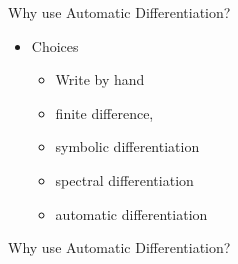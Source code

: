 \documentclass[dvipsnames]{beamer}
\begin{document}
\begin{frame}{Why use Automatic Differentiation?}
\begin{itemize}
    \item Choices
    \begin{itemize}
        \item Write by hand
        \item finite difference,
        \item symbolic differentiation
        \item spectral differentiation
        \item automatic differentiation
    \end{itemize}
\end{itemize}
\end{frame}


\begin{frame}{Why use Automatic Differentiation?}


\end{frame}
\end{document}

